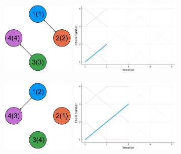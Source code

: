 \begin{figure}[t] 
  \centering 
  \begin{subfigure}{0.48\textwidth}
    \centering
    \includegraphics[width=0.39\textwidth]{img/Communication_1_v3.pdf}
    \includegraphics[width=0.59\textwidth]{img/index_process_1.pdf}
  \end{subfigure}
  \begin{subfigure}{0.48\textwidth}
    \centering
    \includegraphics[width=0.39\textwidth]{img/Communication_2_v3.pdf}
    \includegraphics[width=0.59\textwidth]{img/index_process_2.pdf}

\end{subfigure}
\end{figure}
